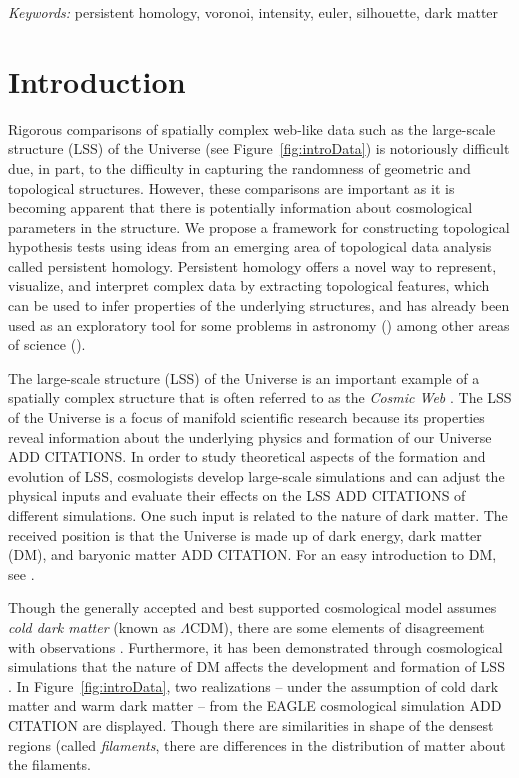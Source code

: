 \documentclass[12pt]{article}
\begin{document}
\noindent%
{\it Keywords:} persistent homology, voronoi, intensity, euler, silhouette, dark matter
\vfill


\newpage
{} %
\section{Introduction}
\label{sec:intro}

Rigorous comparisons of spatially complex web-like data such as the large-scale structure (LSS) of the Universe (see Figure~\ref{fig:introData}) is notoriously difficult due, in part, to the difficulty in capturing the randomness of geometric and topological structures.  However, these comparisons are important as it is becoming apparent that there is potentially information about cosmological parameters in the structure. We propose a framework for constructing  topological hypothesis tests using ideas from an emerging area of topological data analysis called persistent homology. Persistent homology offers a novel way to represent, visualize, and interpret complex data by extracting topological features, which can be used to infer properties of the underlying structures, and has already been used as an exploratory tool for some problems in astronomy (\cite{cisewski2014non, van2011alpha}) among other areas of science (\cite{bendich2014persistent, duong2012closed}).

The large-scale structure (LSS) of the Universe is an important example of a spatially complex structure that is often referred to as the \emph{Cosmic Web} \cite{bond1996filaments,springel2006large}.  The LSS of the Universe is a focus of manifold scientific research because its properties reveal information about the underlying physics and formation of our Universe {\color{red}  ADD CITATIONS}.  In order to study theoretical aspects of the formation and evolution of LSS, cosmologists develop large-scale simulations and can adjust the physical inputs and evaluate their effects on the LSS {\color{red} ADD CITATIONS of different simulations}.  One such input is related to the nature of dark matter.  The received position is that the Universe is made up of dark energy, dark matter (DM), and baryonic matter {\color{red} ADD CITATION}.  For an easy introduction to DM, see \cite[p. 61-63]{HilbeEtAl2014}.  

Though the generally accepted and best supported cosmological model assumes \emph{cold dark matter} (known as $\Lambda$CDM), there are some elements of disagreement with observations \cite{SchneiderEtAl2012}.  Furthermore, it has been demonstrated through cosmological simulations that the nature of DM affects the development and formation of LSS \cite{SchneiderEtAl2012}.  In Figure~\ref{fig:introData}, two realizations -- under the assumption of cold dark matter and warm dark matter -- from the EAGLE cosmological simulation {\color{red} ADD CITATION} are displayed.  Though there are similarities in shape of the densest regions (called \emph{filaments}, there are differences in the distribution of matter about the filaments.  
\end{document}
